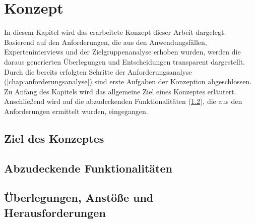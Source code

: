 \chapter{Konzept}
\label{chap:konzept}
    In diesem Kapitel wird das erarbeitete Konzept dieser Arbeit dargelegt. Basierend auf den 
    Anforderungen, die aus den Anwendungsfällen, Experteninterviews und der Zielgruppenanalyse 
    erhoben wurden, werden die daraus generierten Überlegungen und Entscheidungen transparent 
    dargestellt. Durch die bereits erfolgten Schritte der Anforderungsanalyse (\ref{chap:anforderungsanalyse})
    sind erste Aufgaben der Konzeption abgeschlossen. 
    \\
    Zu Anfang des Kapitels wird das allgemeine Ziel eines Konzeptes erläutert. Anschließend 
    wird auf die abzudeckenden Funktionalitäten (\ref{sec:konzeptfunktionalitaet}), die 
    aus den Anforderungen ermittelt wurden, eingegangen. 

\section{Ziel des Konzeptes}
\label{sec:konzeptziele}

\section{Abzudeckende Funktionalitäten}
\label{sec:konzeptfunktionalitaet}

\section{Überlegungen, Anstöße und Herausforderungen}

